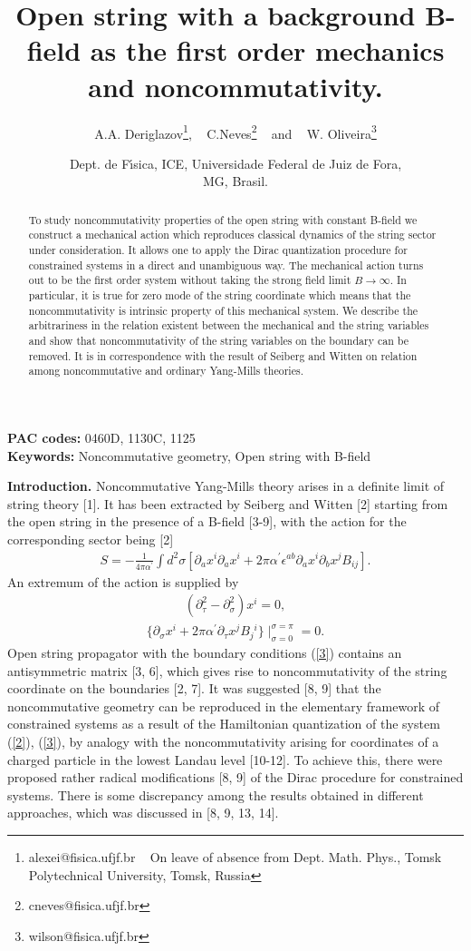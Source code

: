 \documentclass[a4paper]{article}
\title{Open string with a background B-field as the first order
mechanics and noncommutativity.}
\author{A.A. Deriglazov\footnote{alexei@fisica.ufjf.br ~ On leave of
absence from Dept. Math. Phys., Tomsk Polytechnical University,
Tomsk, Russia}, ~
C.Neves\footnote{cneves@fisica.ufjf.br} ~
and ~ W. Oliveira\footnote{wilson@fisica.ufjf.br}}
\date{Dept. de F\'\i sica, ICE, Universidade Federal de Juiz de Fora,\\
MG, Brasil.}
\begin{document}
\maketitle
\large
\begin{abstract}
To study noncommutativity properties of the open string with constant
B-field we construct a mechanical action which reproduces classical
dynamics of the string sector under consideration. It allows one to
apply the Dirac quantization procedure for constrained systems in
a direct and unambiguous way. The mechanical action turns out to be the
first order system without taking the strong field limit
$B\longrightarrow\infty$. In particular, it is true for zero mode
of the string
coordinate which means that the noncommutativity is intrinsic property
of this mechanical system. We describe the arbitrariness in the relation existent 
between the mechanical and the string variables and show that 
noncommutativity of the  string variables on the boundary can be removed. 
It is in correspondence with the result
of Seiberg and Witten on relation among noncommutative and ordinary
Yang-Mills theories.
\end{abstract}

{\bf PAC codes:} 0460D, 1130C, 1125 \\
{\bf Keywords:} Noncommutative geometry, Open string with B-field \\

\newpage

\noindent
{\bf Introduction.} 
Noncommutative Yang-Mills theory arises in a definite limit of string
theory [1]. It has been extracted by Seiberg and Witten  [2] 
starting from the open
string in the presence of a B-field [3-9], with the action for the
corresponding sector being [2]
\begin{eqnarray}\label{1}
S=-\frac{1}{4\pi\alpha^\prime}\int d^2\sigma
\left[\partial_ax^i\partial_ax^i+2\pi\alpha^\prime\epsilon^{ab}
\partial_ax^i\partial_bx^jB_{ij}\right].
\end{eqnarray}
An extremum of the action is supplied by
\begin{eqnarray}\label{2}
(\partial^2_\tau-\partial^2_\sigma)x^i = 0,
\end{eqnarray}
\begin{eqnarray}\label{3}
\lbrace \partial_\sigma x^i+2\pi\alpha^\prime\partial_\tau x^jB_j{}^i\rbrace
\mid_{\sigma=0}^{\sigma=\pi} = 0.
\end{eqnarray}
Open string propagator with the boundary conditions (\ref{3}) contains
an antisymmetric matrix [3, 6], which gives rise to noncommutativity of
the string coordinate on the boundaries [2, 7]. It was suggested [8, 9]
that the noncommutative geometry can be reproduced in the elementary
framework of constrained systems as a result of the Hamiltonian
quantization of the system (\ref{2}), (\ref{3}), by analogy with the
noncommutativity arising for coordinates of a charged particle in
the lowest Landau level [10-12]. To achieve this, there were proposed
rather radical modifications [8, 9] of the Dirac procedure for
constrained systems. There is some discrepancy among the results obtained
in different approaches, which was discussed in [8, 9, 13, 14].
\end{document}
